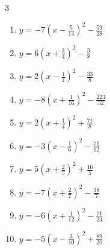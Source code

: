 \begin{multicols}{3}
\begin{enumerate}
  \item $\displaystyle y=-7\left( x-\frac{5}{14}\right)^{2}-\frac{59}{28}$


  \item $\displaystyle y=6\left( x+\frac{3}{4}\right)^{2}-\frac{3}{8}$


  \item $\displaystyle y=2\left( x-\frac{1}{4}\right)^{2}-\frac{33}{8}$


  \item $\displaystyle y=-8\left( x+\frac{1}{16}\right)^{2}-\frac{223}{32}$


  \item $\displaystyle y=2\left( x+\frac{1}{4}\right)^{2}+\frac{71}{8}$


  \item $\displaystyle y=-3\left( x-\frac{1}{6}\right)^{2}-\frac{71}{12}$


  \item $\displaystyle y=5\left( x+\frac{2}{5}\right)^{2}+\frac{16}{5}$


\columnbreak %

  \item $\displaystyle y=-7\left( x+\frac{2}{7}\right)^{2}-\frac{38}{7}$


  \item $\displaystyle y=-6\left( x+\frac{1}{12}\right)^{2}-\frac{71}{24}$


  \item $\displaystyle y=-5\left( x-\frac{3}{10}\right)^{2}+\frac{89}{20}$


\end{enumerate}
\end{multicols}
